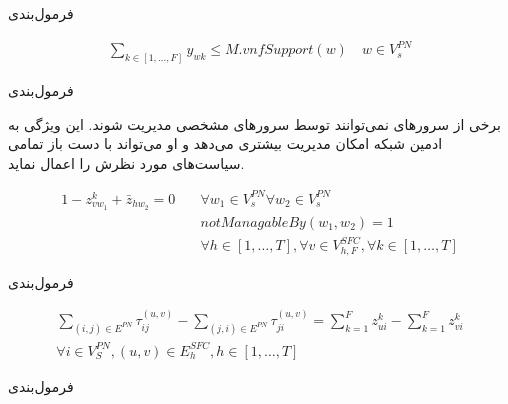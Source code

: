 \documentclass{beamer}
\begin{document}
\begin{persian}
\begin{frame}{فرمول‌بندی}
    \begin{latin}
        \begin{align}
            \sum_{k \in [1, \dots, F]} y_{wk} \le M . vnfSupport(w)
            \quad
            w \in V_{s}^{PN}
        \end{align}
    \end{latin}
\end{frame}
\begin{frame}{فرمول‌بندی}
    \par
    برخی از سرورهای نمی‌توانند توسط سرورهای مشخصی مدیریت شوند.
    این ویژگی به ادمین شبکه امکان مدیریت بیشتری می‌دهد و او می‌تواند با دست باز تمامی
    سیاست‌های مورد نظرش را اعمال نماید.

    \begin{latin}
        \begin{align}
            1 - z_{vw_1}^k + \bar{z}_{hw_2} = 0
            \quad
            & \forall w_1 \in V_s^{PN} \forall w_2 \in V_s^{PN} \nonumber \\
            & notManagableBy(w_1, w_2) = 1 \nonumber \\
            & \forall h \in [1,\dots,T],
            \forall v \in V_{h,F}^{SFC},
            \forall k \in [1,\dots,T]
        \end{align}
    \end{latin}
\end{frame}
\begin{frame}{فرمول‌بندی}
    \par
    \begin{latin}\begin{align}
        \sum_{(i,j) \in E^{PN}} \tau_{ij}^{(u,v)} - \sum_{(j,i) \in E^{PN}} \tau_{ji}^{(u,v)} = \sum_{k=1}^{F} z_{ui}^{k} - \sum_{k=1}^{F} z_{vi}^{k} \nonumber \\
        \forall i \in V_{S}^{PN}, (u,v) \in E_{h}^{SFC}, h \in [1,\ldots, T]
    \end{align}\end{latin}
\end{frame}
\begin{frame}{فرمول‌بندی}
    \par
    \begin{latin}\begin{align}

\end{align}
\end{latin}
\end{frame}
\end{persian}
\end{document}
